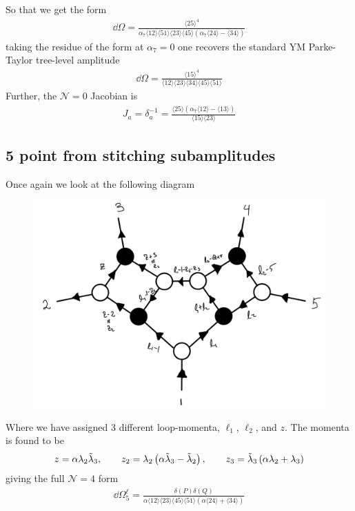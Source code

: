 \documentclass[letter,11pt]{article}
\newcommand{\ab}[1]{\langle #1 \rangle}
\begin{document}
So that we get the form
\begin{equation}
	\begin{aligned}
		\dd \Omega=	\frac{\ab{25}^4}{\alpha_7 \ab{12}\ab{51}\ab{23}\ab{45}\left(\alpha_7\ab{24}-\ab{34}\right)}
	\end{aligned}
\end{equation}
taking the residue of the form at $\alpha_7=0$ one recovers the standard YM Parke-Taylor tree-level amplitude
\begin{equation}
	\begin{aligned}
		\dd \Omega=	\frac{\ab{15}^4}{ \ab{12}\ab{23}\ab{34}\ab{45}\ab{51}}
	\end{aligned}
\end{equation}
Further, the $\mathcal{N}=0$ Jacobian is
\begin{equation}
	\begin{aligned}
		J_a=\delta_a^{-1}=
		\frac{\ab{25}\left(\alpha_7\ab{12}-\ab{13}\right)}{\ab{15}\ab{23}}
	\end{aligned}
\end{equation}
\subsection{5 point from stitching subamplitudes}
Once again we look at the following diagram
\begin{figure}[H]
	\centering
	\includegraphics[width=0.5\linewidth]{5pt3l3}
	\caption{}
	\label{fig:5pt3l_2}
\end{figure}
Where we have assigned 3 different loop-momenta, $\ell_1$, $\ell_2$, and $z$. 
The momenta is found to be
\begin{equation}
	\begin{aligned}
z=\alpha \lambda_2\tilde\lambda_3,~~~~~~
	z_2 = \lambda_2\left(\alpha \tilde \lambda_3- \tilde \lambda_2\right)
,~~~~~~
	z_3 = \tilde \lambda_3\left(\alpha  \lambda_2+ \lambda_3\right)
	\end{aligned}\\
\end{equation}
giving the full $\mathcal{N}=4$ form
\begin{equation}
	\begin{aligned}
	\dd \Omega_5^{\ell}=\frac{\delta(P)\delta(Q)}{\alpha \ab{12}\ab{23}\ab{45}\ab{51}\left(\alpha\ab{24}+\ab{34}\right)}	
	\end{aligned}
\end{equation}
\appendix
\end{document}
